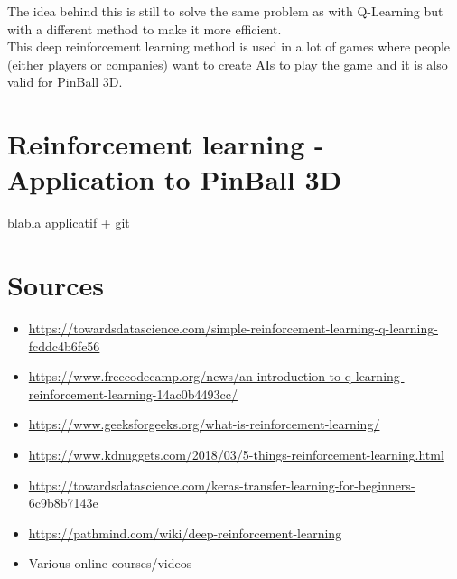 \documentclass[a4paper,12pt,calibri,oneside,openany]{book}
\theoremstyle{break}
\begin{document}
The idea behind this is still to solve the same problem as with Q-Learning but with a different method to make it more efficient.\\

This deep reinforcement learning method is used in a lot of games where people (either players or companies) want to create AIs to play the game and it is also valid for PinBall 3D.

\chapter{Reinforcement learning - Application to PinBall 3D}
blabla applicatif + git
\clearpage
\chapter*{Sources}
\begin{itemize}
	\footnotesize
	\item\url{https://towardsdatascience.com/simple-reinforcement-learning-q-learning-fcddc4b6fe56}
	\item\url{https://www.freecodecamp.org/news/an-introduction-to-q-learning-reinforcement-learning-14ac0b4493cc/}
	\item\url{https://www.geeksforgeeks.org/what-is-reinforcement-learning/}
	\item\url{https://www.kdnuggets.com/2018/03/5-things-reinforcement-learning.html}
	\item\url{https://towardsdatascience.com/keras-transfer-learning-for-beginners-6c9b8b7143e}
	\item\url{https://pathmind.com/wiki/deep-reinforcement-learning}
	\item Various online courses/videos 
\end{itemize}
\end{document}
